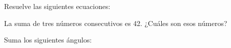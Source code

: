 \documentclass[spanish, 11pt]{exam}
\begin{document}
\begin{questions}
% 
% 
% 
% 

\question
Resuelve las siguientes ecuaciones:

% 
% 

\question[2]
La suma de tres números consecutivos es 42. ¿Cuáles son esos números?


% 

\question[2] Suma los siguientes ángulos:
 \begin{multicols}{2}
\begin{parts}
   

\end{parts}
\end{multicols}
\end{questions}
\end{document}
